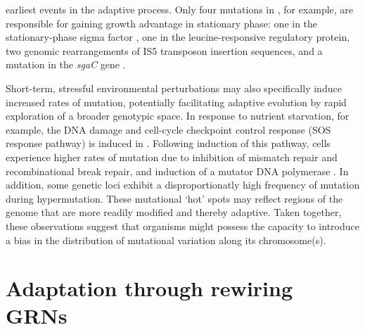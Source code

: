 earliest events in the adaptive process. Only four mutations in \eco, for example, are responsible for gaining growth advantage in stationary phase: one in the stationary-phase sigma factor , one in the leucine-responsive regulatory protein, two genomic rearrangements of IS5 transposon insertion sequences, and a mutation in the \textit{sgaC} gene \cite{zinser_escherichia_2004}.

Short-term, stressful environmental perturbations may also specifically induce increased rates of mutation, potentially facilitating adaptive evolution by rapid exploration of a broader genotypic space. In response to nutrient starvation, for example, the DNA damage and cell-cycle checkpoint control response (SOS response pathway) is induced in \eco. Following induction of this pathway, cells experience higher rates of mutation due to inhibition of mismatch repair and recombinational break repair, and induction of a mutator DNA polymerase \cite{rosenberg_evolving_2001}. In addition, some genetic loci exhibit a disproportionatly high frequency of mutation during hypermutation. These mutational ‘hot’ spots may reflect regions of the genome that are more readily modified and thereby adaptive. Taken together, these observations suggest that organisms might possess the capacity to introduce a bias in the distribution of mutational variation along its chromosome(s).  

\section{Adaptation through rewiring GRNs} 

